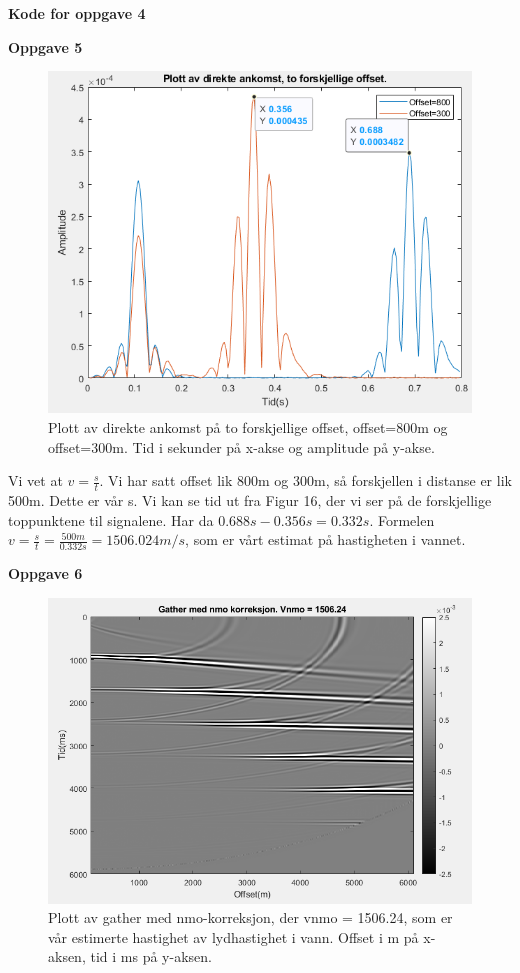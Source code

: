 \documentclass[11pt]{article}
\begin{document}
\textbf{Kode for oppgave 4}

\textbf{Oppgave 5}
\begin{figure}[H]
\includegraphics[scale=0.9]{5_distans.png}
\caption{Plott av direkte ankomst på to forskjellige offset, offset=800m og offset=300m. Tid i sekunder på x-akse og amplitude på y-akse.}
\end{figure}

Vi vet at $v=\frac{s}{t}$. Vi har satt offset lik 800m og 300m, så forskjellen i distanse er lik 500m. Dette er vår s. Vi kan se tid ut fra Figur 16, der vi ser på de forskjellige toppunktene til signalene. Har da $0.688s-0.356s=0.332s$. Formelen $v=\frac{s}{t}=\frac{500m}{0.332s}=1506.024m/s$, som er vårt estimat på hastigheten i vannet.


\textbf{Oppgave 6}

\begin{figure}[H]
\includegraphics[scale=0.7]{6a_vnmo.png}
\caption{Plott av gather med nmo-korreksjon, der vnmo = 1506.24, som er vår estimerte hastighet av lydhastighet i vann. Offset i m på x-aksen, tid i ms på y-aksen.}
\end{figure}
\end{document}
